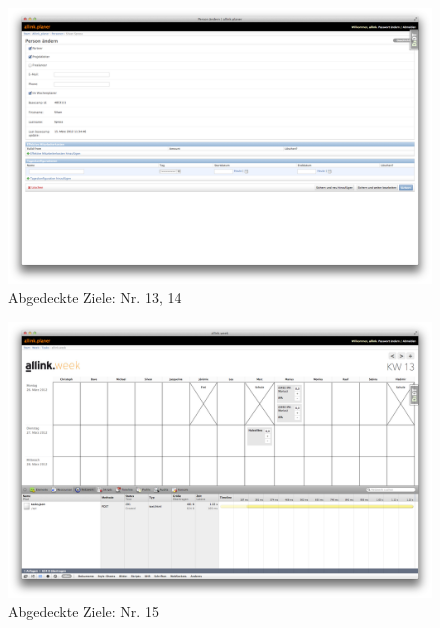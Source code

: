 \begin{figure}[htbp]
    \centering
        \includegraphics[height=0.85\textwidth,angle=90]{bilder/testing/Person_wochenplaner_partner.png}
    \caption{Abgedeckte Ziele: Nr. 13, 14}
    \label{fig:bilder_testing_Person_wochenplaner_partner}
\end{figure}
\begin{figure}[htbp]
    \centering
        \includegraphics[height=0.85\textwidth,angle=90]{bilder/testing/Task_duplizieren.png}
    \caption{Abgedeckte Ziele: Nr. 15}
    \label{fig:bilder_testing_Task_duplizieren}
\end{figure}
